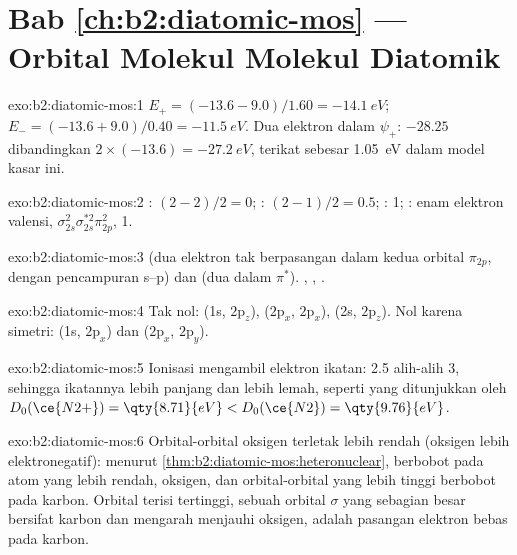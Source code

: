 \section*{Bab \ref{ch:b2:diatomic-mos} --- Orbital Molekul Molekul Diatomik}

\begin{solution}{exo:b2:diatomic-mos:1}
$E_+ = (-13.6 - 9.0)/1.60 = \qty{-14.1}{eV}$; $E_- = (-13.6 + 9.0)/0.40 = \qty{-11.5}{eV}$.
Dua elektron dalam $\psi_+$: $-28.25$ dibandingkan
$2 \times (-13.6) = \qty{-27.2}{eV}$, terikat sebesar \qty{1.05}{eV} dalam
model kasar ini.
\end{solution}

\begin{solution}{exo:b2:diatomic-mos:2}
: $(2 - 2)/2 = 0$; : $(2 - 1)/2 = 0.5$; : 1; :
enam elektron valensi, $\sigma_{2s}^2\sigma_{2s}^{*2}\pi_{2p}^2$,  1.
\end{solution}

\begin{solution}{exo:b2:diatomic-mos:3}
 (dua elektron tak berpasangan dalam kedua orbital $\pi_{2p}$, dengan
pencampuran s--p) dan  (dua dalam $\pi^*$). , , 
.
\end{solution}

\begin{solution}{exo:b2:diatomic-mos:4}
Tak nol: (1s, $2\mathrm p_z$), ($2\mathrm p_x$, $2\mathrm p_x$), (2s,
$2\mathrm p_z$). Nol karena simetri: (1s, $2\mathrm p_x$) dan ($2\mathrm p_x$,
$2\mathrm p_y$).
\end{solution}

\begin{solution}{exo:b2:diatomic-mos:5}
Ionisasi mengambil elektron ikatan:  2.5 alih-alih 3, sehingga
ikatannya lebih panjang dan lebih lemah, seperti yang ditunjukkan oleh
$D_0(\ce{N2+}) = \qty{8.71}{eV} < D_0(\ce{N2}) = \qty{9.76}{eV}$.
\end{solution}

\begin{solution}{exo:b2:diatomic-mos:6}
Orbital-orbital oksigen terletak lebih rendah (oksigen lebih
elektronegatif): menurut \cref{thm:b2:diatomic-mos:heteronuclear},  berbobot pada atom yang lebih rendah, oksigen, dan orbital-orbital
yang lebih tinggi berbobot pada karbon. Orbital terisi tertinggi, sebuah
orbital $\sigma$ yang sebagian besar bersifat karbon dan mengarah menjauhi
oksigen, adalah pasangan elektron bebas pada karbon.
\end{solution}

